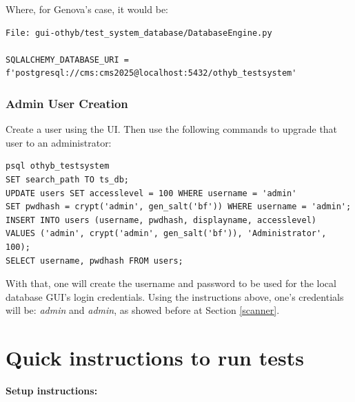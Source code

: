 \documentclass[10pt,a4paper]{article}
\begin{document}
Where, for Genova's case, it would be: 

\begin{framed}
\begin{verbatim}
File: gui-othyb/test_system_database/DatabaseEngine.py

SQLALCHEMY_DATABASE_URI = f'postgresql://cms:cms2025@localhost:5432/othyb_testsystem'
\end{verbatim}
\end{framed}

\subsubsection{Admin User Creation}

Create a user using the UI. Then use the following commands to upgrade that user to an administrator: 

\begin{framed}
\begin{verbatim}
psql othyb_testsystem 
SET search_path TO ts_db; 
UPDATE users SET accesslevel = 100 WHERE username = 'admin'
SET pwdhash = crypt('admin', gen_salt('bf')) WHERE username = 'admin';
INSERT INTO users (username, pwdhash, displayname, accesslevel)
VALUES ('admin', crypt('admin', gen_salt('bf')), 'Administrator', 100);
SELECT username, pwdhash FROM users;
\end{verbatim}
\end{framed}

With that, one will create the username and password to be used for the local database GUI's login credentials. Using the instructions above, one's credentials will be: \textit{admin} and \textit{admin}, as showed before at Section \ref{scanner}.

\newpage

\appendixpage
\large
\section{Quick instructions to run tests}
\label{instruct}

{\Large{\textbf{Setup instructions:}}}
\end{document}
